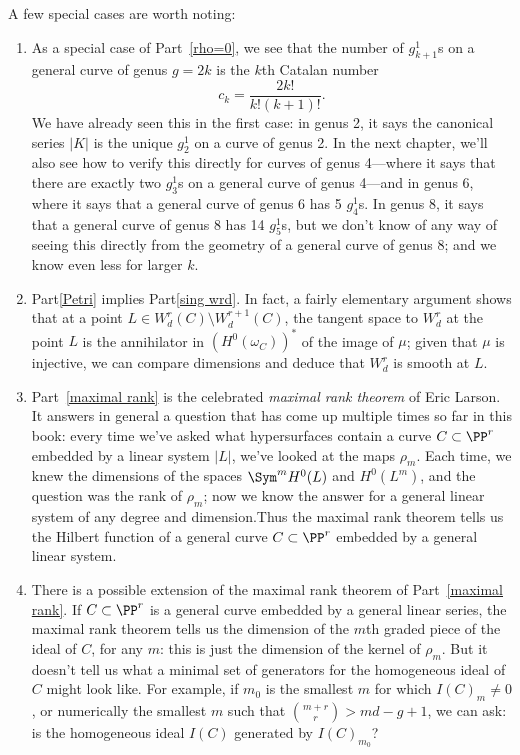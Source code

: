 A few special cases are worth noting:
\begin{enumerate}

\item As a special case of Part~\ref{rho=0}, we see that the number of $g^1_{k+1}$s on a general curve of genus $g = 2k$ is the $k$th Catalan number 
$$
c_k = \frac{2k!}{k!(k+1)!}.
$$
We have already seen this in the first case: in genus 2, it says the canonical series $|K|$ is the unique $g^1_2$ on a curve of genus 2. In the next chapter, we'll also see how to verify this directly for curves of genus 4---where it says that there are exactly two $g^1_3$s on a general curve of genus 4---and in genus 6, where it says that a general curve of genus 6 has 5 $g^1_4$s.  In genus 8, it says that a general curve of genus 8 has 14 $g^1_5$s, but we don't know of any way of seeing this directly from the geometry of a general curve of genus 8; and we know even less for larger $k$.

\item Part\ref{Petri} implies Part\ref{sing wrd}. In fact, a fairly elementary argument shows that at a point $L \in W^r_d(C) \setminus W^{r+1}_d(C)$, the tangent space to $W^r_d$ at the point $L$ is the annihilator
in $(H^0(\omega_C))^*$ of the image of $\mu$; given that $\mu$ is injective, we can compare dimensions and deduce that $W^r_d$ is smooth at $L$.

\item Part~\ref{maximal rank} is the celebrated \emph{maximal rank theorem} of Eric Larson. It answers in general a question that has come up multiple times so far in this book: every time we've asked what hypersurfaces contain a curve $C \subset \PP^r$ embedded by a linear system $|L|$, we've looked at the maps $\rho_m$. Each time, we knew the dimensions of the spaces $\Sym^m H^0(L)$ and $H^0(L^m)$, and the question was the rank of $\rho_m$; now we know the answer for a general linear system of any degree and dimension.Thus the maximal rank theorem tells us the Hilbert function of a general curve $C \subset \PP^r$ embedded by a general linear system.

\item There is a possible extension of the maximal rank theorem of Part~\ref{maximal rank}. If $C \subset \PP^r$ is a general curve embedded by a general linear series, the maximal rank theorem tells us the dimension of the $m$th graded piece of the ideal of $C$, for any $m$: this is just the dimension of the kernel of $\rho_m$. But it doesn't tell us what a minimal set of generators for the homogeneous ideal of $C$ might look like. For example, if $m_0$ is the smallest $m$ for which $I(C)_m \neq 0$, or numerically the smallest $m$ such that $\binom{m+r}{r} > md-g+1$, we can ask: is the homogeneous ideal $I(C)$ generated by $I(C)_{m_0}$?


\end{enumerate}
